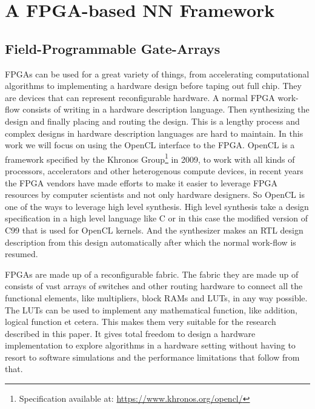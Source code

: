 \documentclass[techrep,english]{ipsj} %
\begin{document}
\section{A FPGA-based NN Framework}\label{sec:framework}
\subsection{Field-Programmable Gate-Arrays}

FPGAs can be used for a great variety of things, from accelerating computational algorithms to implementing a hardware design before taping out full chip.
They are devices that can represent reconfigurable hardware.
A normal FPGA work-flow consists of writing in a hardware description language.
Then synthesizing the design and finally placing and routing the design.
This is a lengthy process and complex designs in hardware description languages are hard to maintain.
In this work we will focus on using the OpenCL interface to the FPGA.
OpenCL is a framework specified by the Khronos Group\footnote{Specification available at: \url{https://www.khronos.org/opencl/}} in 2009, to work with all kinds of processors, accelerators and other heterogenous compute devices, in recent years the FPGA vendors have made efforts to make it easier to leverage FPGA resources by computer scientists and not only hardware designers.
So OpenCL is one of the ways to leverage high level synthesis.
High level synthesis take a design specification in a high level language like C or in this case the modified version of C99 that is used for OpenCL kernels.
And the synthesizer makes an RTL design description from this design automatically after which the normal work-flow is resumed.

FPGAs are made up of a reconfigurable fabric.
The fabric they are made up of consists of vast arrays of switches and other routing hardware to connect all the functional elements, like multipliers, block RAMs and LUTs, in any way possible.
The LUTs can be used to implement any mathematical function, like addition, logical function et cetera.
This makes them very suitable for the research described in this paper.
It gives total freedom to design a hardware implementation to explore algorithms in a hardware setting without having to resort to software simulations and the performance limitations that follow from that.
\end{document}
